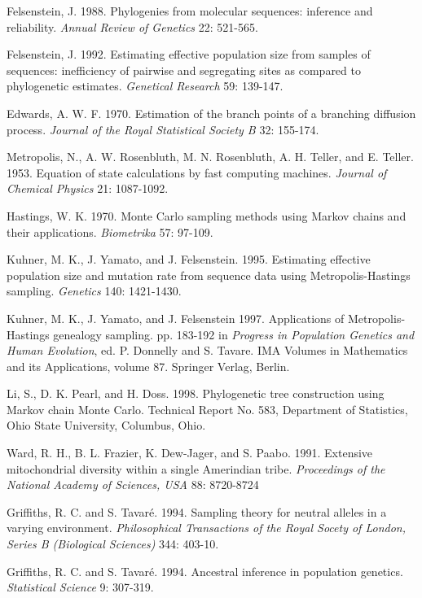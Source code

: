 \begin{thebibliography}{20}
Felsenstein, J. 1988. Phylogenies from molecular sequences: inference and
reliability.  {\it Annual Review of Genetics} 22: 521-565.

Felsenstein, J.  1992.  Estimating effective population size from
samples of sequences: inefficiency of pairwise and segregating sites
as compared to phylogenetic estimates.  {\it Genetical Research}  59: 139-147.

Edwards, A. W. F.  1970.  Estimation of the branch points of a branching
diffusion process. {\it Journal of the Royal Statistical Society B} 32: 155-174.

Metropolis, N., A. W. Rosenbluth, M. N. Rosenbluth, A. H. Teller, and E.
Teller. 1953.  Equation of state calculations by fast computing machines.
{\it Journal of Chemical Physics}  21: 1087-1092.

Hastings, W. K.  1970.  Monte Carlo sampling methods using Markov chains
and their applications.  {\it Biometrika} 57: 97-109.

Kuhner, M. K., J. Yamato, and J. Felsenstein. 1995.
Estimating effective population size and mutation rate from sequence data
using Metropolis-Hastings sampling. {\it Genetics}  140: 1421-1430.

Kuhner, M. K., J. Yamato, and J. Felsenstein  1997.  Applications of
Metropolis-Hastings genealogy sampling.  pp. 183-192 in {\it Progress in Population
Genetics and Human Evolution}, ed. P. Donnelly and S. Tavare.  IMA Volumes in
Mathematics and its Applications, volume 87.  Springer Verlag, Berlin.

Li, S., D. K. Pearl, and H. Doss.  1998.
Phylogenetic tree construction using Markov chain Monte Carlo.  Technical
Report No. 583, Department of Statistics, Ohio State University, Columbus,
Ohio.

Ward, R. H.,  B. L. Frazier,  K. Dew-Jager, and S. Paabo.  1991.
Extensive mitochondrial diversity within a single Amerindian tribe.
{\it Proceedings of the National Academy of Sciences, USA} 88: 8720-8724

Griffiths, R. C. and S. Tavar\'e.  1994.
Sampling theory for neutral alleles in a varying environment.
{\it Philosophical Transactions of the Royal Socety of London, Series B (Biological Sciences)} 344: 403-10.

Griffiths, R. C. and S. Tavar\'e.  1994.  Ancestral inference in population
genetics.  {\it Statistical Science}  9: 307-319.


\end{thebibliography}
